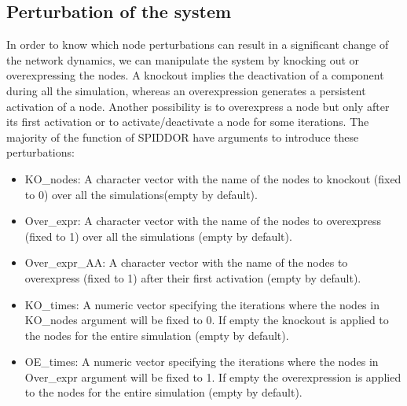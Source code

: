 \documentclass[a4paper]{article}
\begin{document}
\subsection{Perturbation of the system}
In order to know which node perturbations can result in a significant change of the network dynamics, we can manipulate the system by knocking out or overexpressing the nodes. A knockout implies the deactivation of a component during all the simulation, whereas an overexpression generates a persistent activation of a node. Another possibility is to overexpress a node but only after its first activation or to activate/deactivate a node for some iterations. The majority of the function of SPIDDOR have arguments to introduce these perturbations:
\begin{itemize}
  \item{KO\_nodes:}{ A character vector with the name of the nodes to knockout (fixed to 0) over all the simulations(empty by default).}
  \item{Over\_expr:}{ A character vector with the name of the nodes to overexpress (fixed to 1) over all the simulations (empty by default).}
  \item{Over\_expr\_AA:}{ A character vector with the name of the nodes to overexpress (fixed to 1) after their first activation (empty by default).}
  \item{KO\_times:}{ A numeric vector specifying the iterations where the nodes in KO\_nodes argument will be fixed to 0. If empty the knockout is applied to the nodes for the entire simulation (empty by default).}
  \item{OE\_times:}{ A numeric vector specifying the iterations where the nodes in Over\_expr argument will be fixed to 1. If empty the overexpression is applied to the nodes for the entire simulation (empty by default).}
\end{itemize}
\end{document}
